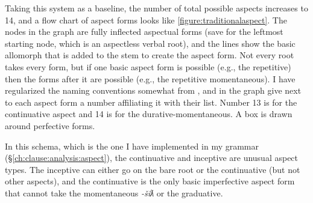 Taking this system as a baseline, the number of total possible aspects increases to 14, and a flow chart of aspect forms looks like \cref{figure:traditionalaspect}. The nodes in the graph are fully inflected aspectual forms (save for the leftmost starting node, which is an aspectless verbal root), and the lines show the basic allomorph that is added to the stem to create the aspect form. Not every root takes every form, but if one basic aspect form is possible (e.g., the repetitive) then the forms after it are possible (e.g., the repetitive momentaneous). I have regularized the naming conventions somewhat from \citeauthor{sapir1939}, and in the graph give next to each aspect form a number affiliating it with their list. Number 13 is for the continuative aspect and 14 is for the durative-momentaneous. A box is drawn around perfective forms.

In this schema, which is the one I have implemented in my grammar (\S\ref{ch:clause:analysis:aspect}), the continuative and inceptive are unusual aspect types. The inceptive can either go on the bare root or the continuative (but not other aspects), and the continuative is the only basic imperfective aspect form that cannot take the momentaneous \textit{-šiƛ} or the graduative.

